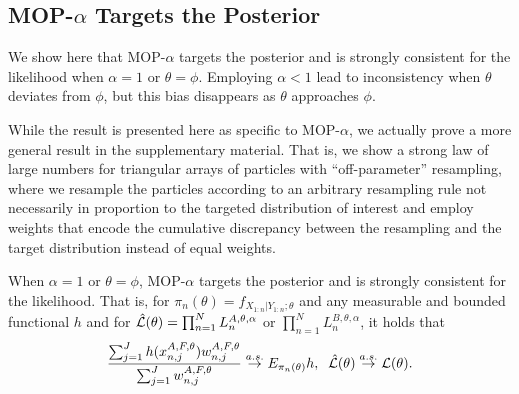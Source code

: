 \documentclass[11pt]{article}
\begin{document}
\subsection{MOP-$\alpha$ Targets the Posterior}


We show here that MOP-$\alpha$ targets the posterior and is strongly consistent for the likelihood when $\alpha=1$ or $\theta=\phi$.
Employing $\alpha<1$ lead to inconsistency when $\theta$ deviates from $\phi$, but this bias disappears as $\theta$ approaches $\phi$.

While the result is presented here as specific to MOP-$\alpha$, we actually prove a more general result in the supplementary material.
That is, we show a strong law of large numbers for triangular arrays of particles with ``off-parameter'' resampling, where we resample the particles according to an arbitrary resampling rule not necessarily in proportion to the targeted distribution of interest and employ weights that encode the cumulative discrepancy between the resampling and the target distribution instead of equal weights.


\begin{thm}
    \label{thm:mop-targeting}
    When $\alpha=1$ or $\theta=\phi$, MOP-$\alpha$ targets the posterior and is strongly consistent for the likelihood. That is, for $\pi_n(\theta)=f_{X_{1:n}|Y_{1:n} ; \theta}$ and any measurable and bounded functional $h$ and for $\hat{\mathcal{L}}(\theta) = \prod_{n=1}^N L_n^{A,\theta,\alpha}$ or $\prod_{n=1}^N L_n^{B,\theta,\alpha}$, it holds that
    \vspace*{-2.5mm}
    \begin{equation}
        \frac{\sum_{j=1}^J h(x_{n,j}^{A,F, \theta}) w_{n,j}^{A,F,\theta}}{\sum_{j=1}^J w_{n,j}^{A,F,\theta}} \stackrel{a.s.}{\to} E_{\pi_n(\theta)} h, \;\; \hat\lik(\theta)  \stackrel{a.s.}{\to} \lik(\theta).
    \vspace*{-2.5mm}
    \end{equation}
\end{thm}
\end{document}
